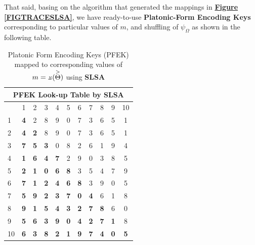 \documentclass[a4paper, 18pt]{book} %
\newcommand{\invpi}{\rotatebox[origin=c]{180}{$\pi$}}
\begin{document}
\begin{appendices}
That said, basing on the algorithm that generated the mappings in \textbf{\hyperref[FIGTRACESLSA]{Figure \ref{FIGTRACESLSA}}}, we have ready-to-use \textbf{Platonic-Form Encoding Keys} corresponding to particular values of $m$, and shuffling of $\psi_{\Omega}$ as shown in the following table.\\


 
\begin{table}[H]
  \centering
  \Large
	\begin{tabular}[t]{|p{6cm}||c|c|c|c|c|c|c|c|c|c|}
	\hline
	\multicolumn{11}{|c|}{\textbf{PFEK Look-up Table by SLSA}}\\
	\hline
	\hline
	\diagbox{$m = \invpi(\overset{>}{\Theta})$}{$I(\omega_i,\overset{>}{\Theta})$} & 1 & 2 & 3 & 4 & 5 & 6 & 7 & 8 & 9 & 10\\
	\hline
	\hline
	1 & \textbf{4} & 2 & 8 & 9 & 0 & 7 & 3 & 6 & 5 & 1\\ 
	\hline
	2 & \textbf{4} & \textbf{2} & 8 & 9 & 0 & 7 & 3 & 6 & 5 & 1\\ 
	\hline
	3 & \textbf{7} & \textbf{5} & \textbf{3} & 0 & 8 & 2 & 6 & 1 & 9 & 4\\ 
	\hline
	4 & \textbf{1} & \textbf{6} & \textbf{4} & \textbf{7} & 2 & 9 & 0 & 3 & 8 & 5\\ 
	\hline
	5 & \textbf{2} & \textbf{1} & \textbf{0} & \textbf{6} & \textbf{8} & 3 & 5 & 4 & 7 & 9\\ 
	\hline
	6 & \textbf{7} & \textbf{1} & \textbf{2} & \textbf{4} & \textbf{6} & \textbf{8} & 3 & 9 & 0 & 5\\ 
	\hline
	7 & \textbf{5} & \textbf{9} & \textbf{2} & \textbf{3} & \textbf{7} & \textbf{0} & \textbf{4} & 6 & 1 & 8\\ 
	\hline
	8 & \textbf{9} & \textbf{1} & \textbf{5} & \textbf{4} & \textbf{3} & \textbf{2} & \textbf{7} & \textbf{8} & 6 & 0\\ 
	\hline
	9 & \textbf{5} & \textbf{6} & \textbf{3} & \textbf{9} & \textbf{0} & \textbf{4} & \textbf{2} & \textbf{7} & \textbf{1} & 8\\ 
	\hline
	10 & \textbf{6} & \textbf{3} & \textbf{8} & \textbf{2} & \textbf{1} & \textbf{9} & \textbf{7} & \textbf{4} & \textbf{0} & \textbf{5}\\
	              \hline
\end{tabular}
 \caption{Platonic Form Encoding Keys (PFEK) mapped to corresponding values of $m = \invpi(\overset{>}{\Theta})$ using \textbf{SLSA}}
  \label{TABSSLAPERK}
\end{table}



\end{appendices}
\end{document}
